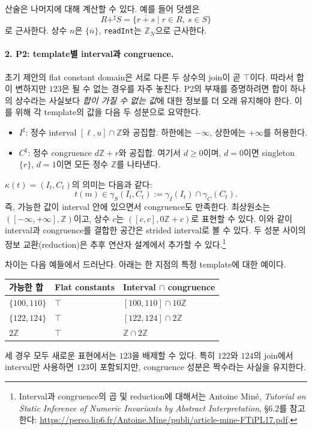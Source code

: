 \documentclass[a4paper,10pt]{article}
\newcommand{\Isharp}{I^\sharp}
\newcommand{\Csharp}{C^\sharp}
\newcommand{\remN}[1]{\overline{#1}}
\begin{document}
산술은 나머지에 대해 계산할 수 있다. 예를 들어 덧셈은
\[
 R+^\sharp S=\{\remN{r+s}\mid r\in R,\ s\in S\}
\]
로 근사한다. 상수 $n$은 $\{\remN{n}\}$,
\texttt{readInt}는 $\mathbb Z_N$으로 근사한다.

\paragraph{2. P2: template별 interval과 congruence.}
초기 제안의 flat constant domain은 서로 다른 두 상수의 join이 곧 $\top$이다.
따라서 합이 변하지만 $123$은 될 수 없는 경우를 자주 놓친다.
P2의 부재를 증명하려면 합이 하나의 상수라는 사실보다
\emph{합이 가질 수 없는 값}에 대한 정보를 더 오래 유지해야 한다.
이를 위해 각 template의 값을 다음 두 성분으로 요약한다.

\begin{itemize}[leftmargin=*,itemsep=3pt]
 \item $\Isharp$: 정수 interval $[\ell,u]\cap\mathbb Z$와 공집합.
 하한에는 $-\infty$, 상한에는 $+\infty$를 허용한다.
 \item $\Csharp$: 정수 congruence $d\mathbb Z+r$와 공집합.
 여기서 $d\ge0$이며, $d=0$이면 singleton $\{r\}$,
 $d=1$이면 모든 정수 $\mathbb Z$를 나타낸다.
\end{itemize}

$\kappa(t)=(I_t,C_t)$의 의미는 다음과 같다:
\[
 t(m)\in\gamma_S(I_t,C_t)
       :=\gamma_I(I_t)\cap\gamma_C(C_t).
\]
즉, 가능한 값이 interval 안에 있으면서 congruence도 만족한다.
최상원소는 $([-\infty,+\infty],\mathbb Z)$이고,
상수 $c$는 $([c,c],0\mathbb Z+c)$로 표현할 수 있다.
이와 같이 interval과 congruence를 결합한 공간은
strided interval로 볼 수 있다. 두 성분 사이의 정보 교환(reduction)은
추후 연산자 설계에서 추가할 수 있다.\footnote{Interval과 congruence의
곱 및 reduction에 대해서는 Antoine Min\'e,
\emph{Tutorial on Static Inference of Numeric Invariants by Abstract Interpretation},
\S6.2를 참고한다:
\url{https://perso.lip6.fr/Antoine.Mine/publi/article-mine-FTiPL17.pdf}.}

차이는 다음 예들에서 드러난다. 아래는 한 지점의 특정 template에 대한 예이다.
\begin{center}
\begin{tabular}{lll}
\toprule
가능한 합 & Flat constants & Interval $\cap$ congruence \\
\midrule
$\{100,110\}$ & $\top$ & $[100,110]\cap10\mathbb Z$ \\
$\{122,124\}$ & $\top$ & $[122,124]\cap2\mathbb Z$ \\
$2\mathbb Z$ & $\top$ & $\mathbb Z\cap2\mathbb Z$ \\
\bottomrule
\end{tabular}
\end{center}
세 경우 모두 새로운 표현에서는 $123$을 배제할 수 있다.
특히 $122$와 $124$의 join에서 interval만 사용하면 $123$이 포함되지만,
congruence 성분은 짝수라는 사실을 유지한다.
\end{document}
